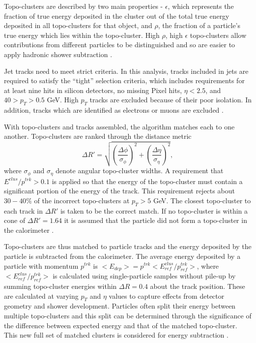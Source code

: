 Topo-clusters are described by two main properties - $\epsilon$, which represents the fraction of true energy deposited in the cluster out of the total true energy deposited in all topo-clusters for that object, and $\rho$, the fraction of a particle's true energy which lies within the topo-cluster. High $\rho$, high $\epsilon$ topo-clusters allow contributions from different particles to be distinguished and so are easier to apply hadronic shower subtraction \cite{ParticleFlow}.

Jet tracks need to meet strict criteria. In this analysis, tracks included in jets are required to satisfy the ``tight'' selection criteria, which includes requirements for at least nine hits in silicon detectors, no missing Pixel hits, $\eta<2.5$, and $40>p_T>0.5$ GeV. High $p_T$ tracks are excluded because of their poor isolation. In addition, tracks which are identified as electrons or muons are excluded \cite{ParticleFlow}. 

With topo-clusters and tracks assembled, the algorithm matches each to one another. Topo-clusters are ranked through the distance metric 
\begin{equation}
\Delta R' = \sqrt{(\frac{\Delta \phi}{\sigma_\phi})^2+(\frac{\Delta \eta}{\sigma_\eta})^2},
\end{equation}
where $\sigma_\phi$ and $\sigma_\eta$ denote angular topo-cluster widths. A requirement that $E^{clus}/p^{trk}>0.1$ is applied so that the energy of the topo-cluster must contain a significant portion of the energy of the track. This requirement rejects about $30-40\%$ of the incorrect topo-clusters at $p_T>5$ GeV. The closest topo-cluster to each track in $\Delta R'$ is taken to be the correct match. If no topo-cluster is within a cone of $\Delta R'= 1.64$ it is assumed that the particle did not form a topo-cluster in the calorimeter \cite{ParticleFlow}. 

Topo-clusters are thus matched to particle tracks and the energy deposited by the particle is subtracted from the calorimeter. The average energy deposited by a particle with momentum $p^{trk}$ is $<E_{dep}>=p^{trk}<E_{ref}^{clus}/p_{ref}^{trk}>$, where $<E_{ref}^{clus}/p_{ref}^{trk}>$ is calculated using single-particle samples without pile-up by summing topo-cluster energies within $\Delta R = 0.4$ about the track position. These are calculated at varying $p_T$ and $\eta$ values to capture effects from detector geometry and shower development. Particles often split their energy between multiple topo-clusters and this split can be determined through the significance of the difference between expected energy and that of the matched topo-cluster. This new full set of matched clusters is considered for energy subtraction \cite{ParticleFlow}. 

